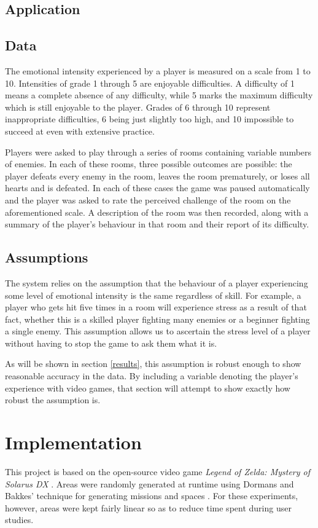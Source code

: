 \documentclass[a4paper]{article}
\begin{document}
\begin{multicols*}{2}
\subsection{Application}

\subsection{Data} \label{data}
The emotional intensity experienced by a player is measured on a scale from 1 to 10. Intensities of grade 1 through 5 are enjoyable difficulties. A difficulty of 1 means a complete absence of any difficulty, while 5 marks the maximum difficulty which is still enjoyable to the player. Grades of 6 through 10 represent inappropriate difficulties, 6 being just slightly too high, and 10 impossible to succeed at even with extensive practice.

Players were asked to play through a series of rooms containing variable numbers of enemies. In each of these rooms, three possible outcomes are possible: the player  defeats every enemy in the room, leaves the room prematurely, or loses all hearts and is defeated. In each of these cases the game was paused automatically and the player was asked to rate the perceived challenge of the room on the aforementioned scale. A description of the room was then recorded, along with a summary of the player's behaviour in that room and their report of its difficulty.

\subsection{Assumptions}
The system relies on the assumption that the behaviour of a player experiencing some level of emotional intensity is the same regardless of skill. For example, a player who gets hit five times in a room will experience stress as a result of that fact, whether this is a skilled player fighting many enemies or a beginner fighting a single enemy. This assumption allows us to ascertain the stress level of a player without having to stop the game to ask them what it is.

As will be shown in section \ref{results}, this assumption is robust enough to show reasonable accuracy in the data. By including a variable denoting the player's experience with video games, that section will attempt to show exactly how robust the assumption is.

\section{Implementation}
This project is based on the open-source video game \emph{Legend of Zelda: Mystery of Solarus DX} \cite{zeldasolarus}. Areas were randomly generated at runtime using Dormans and Bakkes' technique for generating missions and spaces \cite{missiongrammar}. For these experiments, however, areas were kept fairly linear so as to reduce time spent during user studies. 


\end{multicols*}
\end{document}
